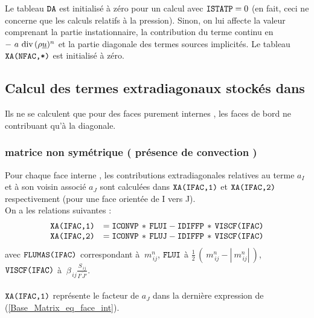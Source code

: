 Le tableau $\text{\texttt{DA}}$ est initialis\'e \`a z\'ero pour un calcul avec
$ \text{\texttt{ISTATP}} = 0 $ (en fait, ceci ne concerne que les calculs relatifs \`a la
pression). Sinon, on lui affecte la valeur  comprenant la partie instationnaire, la contribution du terme continu en $-\ a\ \text{div}\,(\rho \underline{u})^n$
et la partie diagonale des termes sources implicit\'es. Le tableau
$\text{\texttt{XA(NFAC,*)}}$ est initialis\'e \`a z\'ero.\\
\subsection*{\bf Calcul des termes extradiagonaux stock\'es dans  }
Ils ne se calculent que pour des faces purement internes , les faces
de bord ne contribuant qu'\`a la diagonale.
\subsubsection*{matrice non sym\'etrique ( pr\'esence de convection ) }
Pour chaque face interne , les contributions extradiagonales relatives
au terme $a_I$ et \`a son voisin  associ\'e $a_J$ sont calcul\'ees dans
$\text{\texttt{XA(IFAC,1)}}$ et $\text{\texttt{XA(IFAC,2)}}$ respectivement (pour une face orientée
de I vers J).\\
On a les relations suivantes :\\
\begin{equation}\label{Base_Matrix_eq_extra}
\begin{array}{ll}
\text{\texttt{XA(IFAC,1)}}& = \text{\texttt{ICONVP}}\,*\,\text{\texttt{FLUI}} - \text{\texttt{IDIFFP}}\,*\,\text{\texttt{VISCF(IFAC)}}\\
\text{\texttt{XA(IFAC,2)}}& = \text{\texttt{ICONVP}}\,*\,\text{\texttt{FLUJ}} - \text{\texttt{IDIFFP}}\,*\,\text{\texttt{VISCF(IFAC)}}\\
\end{array}
\end{equation}
avec $\text{\texttt{FLUMAS(IFAC)}}$  correspondant \`a $\ m_{\,ij}^n$, $\text{\texttt{FLUI}}$ \`a $ \displaystyle\frac{1}{2}\,(\ m_{\,ij}^n - |\
m_{\,ij}^n|\ )$, $\text{\texttt{VISCF(IFAC)}} $ \`a $ \ \displaystyle \beta_{\,ij}\frac {
S_{\,ij}}{\overline{I'J'}} $.\\\\
$\text{\texttt{XA(IFAC,1)}}$ repr\'esente le facteur de $a_J$ dans la
derni\`ere expression de (\ref{Base_Matrix_eq_face_int}).\\

